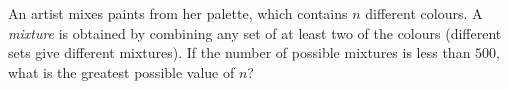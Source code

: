 An artist mixes paints from her palette, which contains $n$ different colours. A \emph{mixture} is obtained by combining any set of at least two of the colours (different sets give different mixtures). If the number of possible mixtures is less than $500$, what is the greatest possible value of $n$?
